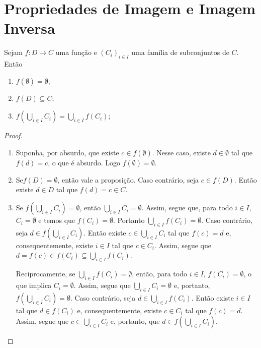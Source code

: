 \section{Propriedades de Imagem e Imagem Inversa}

\begin{prop}
	Sejam $f: D \to C$ uma função e $(C_i)_{i \in I}$ uma família de subconjuntos de $C$. Então
	\begin{enumerate}
	\item $f(\emptyset) = \emptyset$;
	\item $f(D) \subseteq C$;
	\item $f\left(\displaystyle\bigcup_{i \in I} C_i \right) = \displaystyle\bigcup_{i \in I} f(C_i)$;
	\end{enumerate}
\end{prop}
\begin{proof}
	\begin{enumerate}
	\item Suponha, por absurdo, que existe $c \in f(\emptyset)$. Nesse caso, existe $d \in \emptyset$ tal que $f(d) = c$, o que é absurdo. Logo $f(\emptyset) = \emptyset$.
	\item Se$f(D)=\emptyset$, então vale a proposição. Caso contrário, seja $c \in f(D)$. Então existe $d \in D$ tal que $f(d)=c \in C$.
	\item Se $f \left( \bigcup_{i \in I} C_i \right) = \emptyset$, então $\bigcup_{i \in I} C_i = \emptyset$. Assim, segue que, para todo $i \in I$, $C_i = \emptyset$ e temos que $f(C_i)=\emptyset$. Portanto $\bigcup_{i \in I} f(C_i) = \emptyset$. Caso contrário, seja $d \in f \left( \bigcup_{i \in I} C_i \right)$. Então existe $c \in \bigcup_{i \in I} C_i$ tal que $f(c)=d$ e, consequentemente, existe $i \in I$ tal que $c \in C_i$. Assim, segue que $d=f(c) \in f(C_i) \subseteq \bigcup_{i \in I} f(C_i)$.
	
	Reciprocamente, se $\bigcup_{i \in I} f(C_i) = \emptyset$, então, para todo $i \in I$, $f(C_i) = \emptyset$, o que implica $C_i = \emptyset$. Assim, segue que $\bigcup_{i \in I} C_i = \emptyset$ e, portanto, $f\left(\bigcup_{i \in I} C_i \right) = \emptyset$. Caso contrário, seja $d \in \bigcup_{i \in I} f(C_i)$. Então existe $i \in I$ tal que $d \in f(C_i)$ e, consequentemente, existe $c \in C_i$ tal que $f(c)=d$. Assim, segue que $c \in \bigcup_{i \in I} C_i$ e, portanto, que $d \in f\left(\bigcup_{i \in I} C_i \right)$.
	\end{enumerate}
\end{proof}




